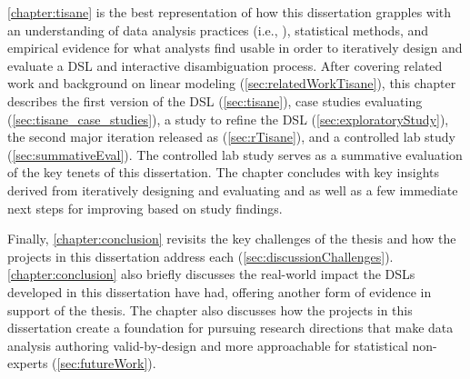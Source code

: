 \autoref{chapter:tisane} is the best representation of how this dissertation
grapples with an understanding of data analysis practices (i.e., \hypoForm),
statistical methods, and empirical evidence for what analysts find usable in
order to iteratively design and evaluate a DSL and interactive disambiguation
process. After covering related work and background on linear modeling
(\autoref{sec:relatedWorkTisane}), this chapter describes the first version of
the \tisane DSL (\autoref{sec:tisane}), case studies evaluating \tisane
(\autoref{sec:tisane_case_studies}), a study to refine the DSL
(\autoref{sec:exploratoryStudy}), the second major iteration released as
\rTisane (\autoref{sec:rTisane}), and a controlled lab study
(\autoref{sec:summativeEval}). The controlled lab study serves as a summative
evaluation of the key tenets of this dissertation. The chapter concludes with
key insights derived from iteratively designing and evaluating \tisane and
\rTisane as well as a few immediate next steps for improving \rTisane based on
study findings.


Finally, \autoref{chapter:conclusion} revisits the key challenges of the thesis
and how the projects in this dissertation address each
(\autoref{sec:discussionChallenges}). \autoref{chapter:conclusion} also briefly
discusses the real-world impact the DSLs developed in this dissertation have
had, offering another form of evidence in support of the thesis. The chapter
also discusses how the projects in this dissertation create a foundation for
pursuing research directions that make data analysis authoring valid-by-design
and more approachable for statistical non-experts (\autoref{sec:futureWork}). 


\begin{comment}
\todo{Fill in this outline}

\section*{How to approach this dissertation} \todo{Decide if want to keep}

\section{Prior Publication and Authorship} \todo{fill in}
\end{comment}